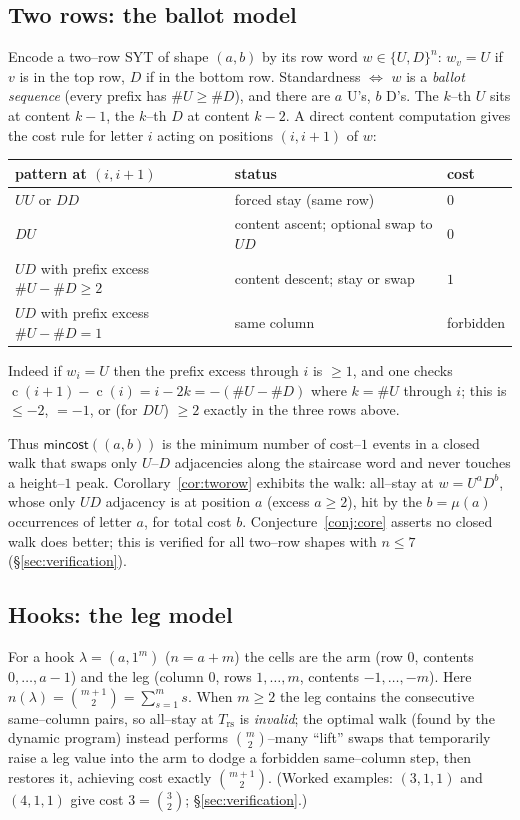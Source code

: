 \documentclass[11pt]{article}
\theoremstyle{definition}
\DeclareMathOperator{\content}{c}
\begin{document}
\subsection{Two rows: the ballot model}
Encode a two--row SYT of shape $(a,b)$ by its row word
$w\in\{U,D\}^n$: $w_v=U$ if $v$ is in the top row, $D$ if in the bottom row.
Standardness $\Leftrightarrow$ $w$ is a \emph{ballot sequence} (every prefix
has $\#U\ge\#D$), and there are $a$ U's, $b$ D's. The $k$--th $U$ sits at
content $k-1$, the $k$--th $D$ at content $k-2$. A direct content computation
gives the cost rule for letter $i$ acting on positions $(i,i{+}1)$ of $w$:
\begin{center}
\begin{tabular}{lll}
pattern at $(i,i{+}1)$ & status & cost \\\hline
$UU$ or $DD$ & forced stay (same row) & $0$\\
$DU$ & content ascent; optional swap to $UD$ & $0$\\
$UD$ with prefix excess $\#U-\#D\ge2$ & content descent; stay or swap & $1$\\
$UD$ with prefix excess $\#U-\#D=1$ & same column & forbidden \\
\end{tabular}
\end{center}
Indeed if $w_i=U$ then the prefix excess through $i$ is $\ge1$, and one checks
$\content(i{+}1)-\content(i)=i-2k=-(\#U-\#D)$ where $k=\#U$ through $i$; this is
$\le-2$, $=-1$, or (for $DU$) $\ge2$ exactly in the three rows above.

Thus $\mathsf{mincost}((a,b))$ is the minimum number of cost--$1$ events in a
closed walk that swaps only $U$--$D$ adjacencies along the staircase word and
never touches a height--$1$ peak. Corollary~\ref{cor:tworow} exhibits the
walk: all--stay at $w=U^aD^b$, whose only $UD$ adjacency is at position $a$
(excess $a\ge2$), hit by the $b=\mu(a)$ occurrences of letter $a$, for total
cost $b$. Conjecture~\ref{conj:core} asserts no closed walk does better; this
is verified for all two--row shapes with $n\le7$ (\S\ref{sec:verification}).

\subsection{Hooks: the leg model}
For a hook $\lambda=(a,1^m)$ ($n=a+m$) the cells are the arm
(row $0$, contents $0,\dots,a-1$) and the leg (column $0$, rows $1,\dots,m$,
contents $-1,\dots,-m$). Here $n(\lambda)=\binom{m+1}{2}=\sum_{s=1}^{m}s$.
When $m\ge2$ the leg contains the consecutive same--column pairs, so all--stay
at $T_{\mathrm{rs}}$ is \emph{invalid}; the optimal walk (found by the dynamic
program) instead performs $\binom m2$--many ``lift'' swaps that temporarily
raise a leg value into the arm to dodge a forbidden same--column step, then
restores it, achieving cost exactly $\binom{m+1}{2}$. (Worked examples:
$(3,1,1)$ and $(4,1,1)$ give cost $3=\binom32$; \S\ref{sec:verification}.)
\end{document}
